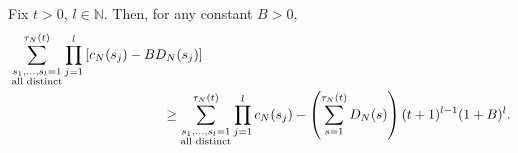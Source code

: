 \begin{lemma}\label{thm:sumprod3}
Fix $t>0$, $l\in\mathbb{N}$.
Then, for any constant $B>0$,
\begin{align*}
&\sum_{\substack{ s_1, \dots, s_l =1 \\ \text{\normalfont{all distinct}} }}^{\tau_N(t)} 
        \prod_{j=1}^l \left[ c_N(s_j) - B D_N(s_j) \right] \\
&\hspace{4cm}\geq \sum_{\substack{ s_1, \dots, s_l =1 \\ \text{\normalfont{all distinct}} }}^{\tau_N(t)} 
        \prod_{j=1}^l c_N(s_j)
        - \left( \sum_{s=1}^{\tau_N(t)} D_N(s) \right) (t+1)^{l-1} (1+B)^l .
\end{align*}
\end{lemma}

